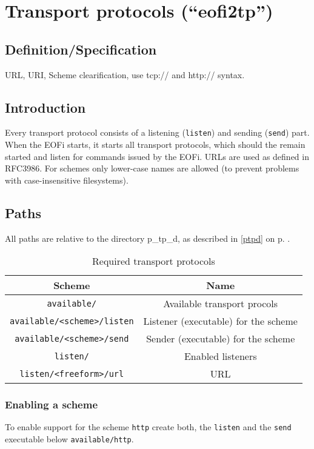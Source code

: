 \section{Transport protocols ("`eofi2tp"')}
\label{eofi2tp}
\subsection{Definition/Specification}
URL, URI, Scheme clearification, use tcp:// and http:// syntax.


\subsection{Introduction}
Every transport protocol consists of a listening (\verb=listen=)
and sending (\verb=send=) part. When the EOFi starts, it starts all
transport protocols, which should the remain started and listen
for commands issued by the EOFi.
URLs are used as defined in RFC3986\cite{uri-1}.
For schemes only lower-case names are allowed
(to prevent problems with case-insensitive filesystems).
\subsection{Paths}
\label{tppaths}
All paths are relative to the directory p\_tp\_d, as described
in \ref{ptpd} on p. \pageref{ptpd}.
\begin{longtable}{|c|c|}
\caption{Required transport protocols}\\
\hline
\textbf{Scheme} & \textbf{Name}\\
\hline
\verb=available/= & Available transport procols\\
\hline
\verb=available/<scheme>/listen= & Listener (executable) for the scheme\\
\hline
\verb=available/<scheme>/send= & Sender (executable) for the scheme\\
\hline
\verb=listen/= & Enabled listeners\\
\hline
\verb=listen/<freeform>/url= & URL \\
\hline
\end{longtable}
\subsubsection{Enabling a scheme}
\label{tpscheme}
To enable support for the scheme \verb=http=
create both, the \verb=listen= and the \verb=send= executable below
\verb=available/http=.
